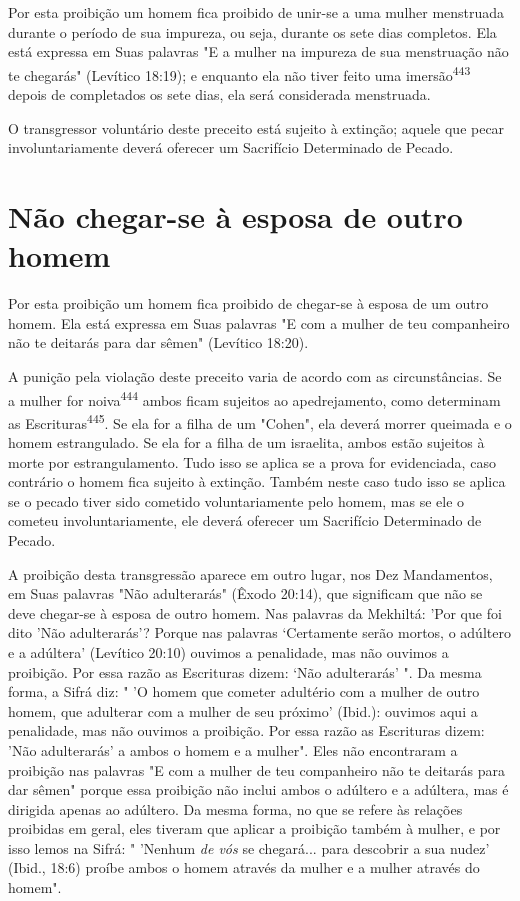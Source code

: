 \begin{itemize}
\begin{enumrate}
\begin{itemize}
\begin{itemize}
\begin{itemize}
Por esta proibição um homem fica proibido de unir-se a uma mu­lher
menstruada durante o período de sua impureza, ou seja, durante os sete
dias completos. Ela está expressa em Suas palavras "E a mulher na impureza de
sua menstruação não te chegarás" (Levítico 18:19); e enquanto ela não
tiver feito uma imersão\textsuperscript{443} depois de completados os
sete dias, ela será considerada menstruada.

O transgressor voluntário deste preceito está sujeito à extinção; aquele
que pecar involuntariamente deverá oferecer um Sacrifício Determinado de
Pecado.

\section{Não chegar-se à esposa de outro homem}

Por esta proibição um homem fica proibido de chegar-se à esposa de um
outro homem. Ela está expressa em Suas palavras "E com a mulher de teu
companheiro não te deitarás para dar sêmen" (Levítico 18:20).

A punição pela violação deste preceito varia de acordo com as
cir­cunstâncias. Se a mulher for noiva\textsuperscript{444} ambos ficam
sujeitos ao apedrejamen­to, como determinam as
Escrituras\textsuperscript{445}. Se ela for a filha de um "Cohen", ela
deverá morrer queimada e o homem estrangulado. Se ela for a filha de um
is­raelita, ambos estão sujeitos à morte por estrangulamento. Tudo isso
se aplica se a prova for evidenciada, caso contrário o homem fica
sujeito à extinção. Tam­bém neste caso tudo isso se aplica se o pecado
tiver sido cometido voluntaria­mente pelo homem, mas se ele o cometeu
involuntariamente, ele deverá ofere­cer um Sacrifício Determinado de
Pecado.

A proibição desta transgressão aparece em outro lugar, nos Dez
Man­damentos, em Suas palavras "Não adulterarás" (Êxodo 20:14), que
significam que não se deve chegar-se à esposa de outro homem. Nas
palavras da Mekhiltá: 'Por que foi dito 'Não adulterarás'? Porque nas
palavras `Certamente serão mor­tos, o adúltero e a adúltera' (Levítico
20:10) ouvimos a penalidade, mas não ouvimos a proibição. Por essa razão
as Escrituras dizem: `Não adulterarás' ". Da mesma forma, a Sifrá diz: "
'O homem que cometer adultério com a mulher de outro homem, que
adulterar com a mulher de seu próximo' (Ibid.): ouvi­mos aqui a
penalidade, mas não ouvimos a proibição. Por essa razão as Escritu­ras
dizem: 'Não adulterarás' a ambos o homem e a mulher". Eles não
encontra­ram a proibição nas palavras "E com a mulher de teu companheiro
não te dei­tarás para dar sêmen" porque essa proibição não inclui ambos
o adúltero e a adúltera, mas é dirigida apenas ao adúltero. Da mesma
forma, no que se refere às relações proibidas em geral, eles tiveram que
aplicar a proibição também à mulher, e por isso lemos na Sifrá: "
'Nenhum \emph{de vós} se chegará... para desco­brir a sua nudez' (Ibid.,
18:6) proíbe ambos o homem através da mulher e a mulher através do
homem".


\end{itemize}
\end{itemize}
\end{itemize}
\end{enumrate}
\end{itemize}
